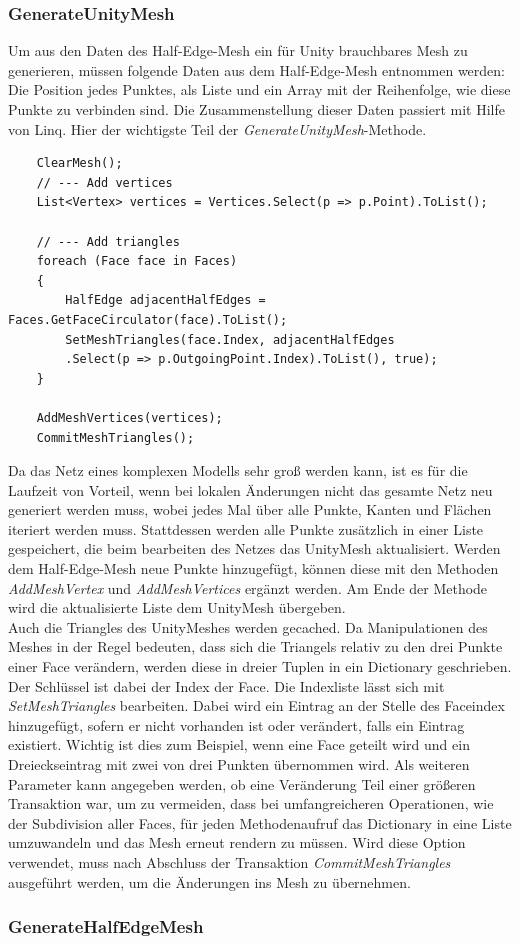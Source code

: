 \subsubsection{GenerateUnityMesh}
Um aus den Daten des Half-Edge-Mesh ein f\"ur Unity brauchbares Mesh zu generieren, m\"ussen folgende Daten aus dem Half-Edge-Mesh entnommen werden: Die Position jedes Punktes, als Liste und ein Array mit der Reihenfolge, wie diese Punkte zu verbinden sind. Die Zusammenstellung dieser Daten passiert mit Hilfe von Linq. Hier der wichtigste Teil der \textit{GenerateUnityMesh}-Methode.
\begin{lstlisting}
	ClearMesh();
	// --- Add vertices
	List<Vertex> vertices = Vertices.Select(p => p.Point).ToList();

	// --- Add triangles
	foreach (Face face in Faces)
	{
		HalfEdge adjacentHalfEdges = Faces.GetFaceCirculator(face).ToList();
		SetMeshTriangles(face.Index, adjacentHalfEdges
		.Select(p => p.OutgoingPoint.Index).ToList(), true);
	}

	AddMeshVertices(vertices);
	CommitMeshTriangles();
\end{lstlisting}
Da das Netz eines komplexen Modells sehr gro{\ss} werden kann, ist es f\"ur die Laufzeit von Vorteil, wenn bei lokalen \"Anderungen nicht das gesamte Netz neu generiert werden muss, wobei jedes Mal \"uber alle Punkte, Kanten und Fl\"achen iteriert werden muss. Stattdessen werden alle Punkte zus\"atzlich in einer Liste gespeichert, die beim bearbeiten des Netzes das UnityMesh aktualisiert. Werden dem Half-Edge-Mesh neue Punkte hinzugef\"ugt, k\"onnen diese mit den Methoden \textit{AddMeshVertex} und \textit{AddMeshVertices} erg\"anzt werden. Am Ende der Methode wird die aktualisierte Liste dem UnityMesh \"ubergeben. 
\\
Auch die Triangles des UnityMeshes werden gecached. Da Manipulationen des Meshes in der Regel bedeuten, dass sich die Triangels relativ zu den drei Punkte einer Face ver\"andern, werden diese in dreier Tuplen in ein Dictionary geschrieben. Der Schl\"ussel ist dabei der Index der Face. Die Indexliste l\"asst sich mit \textit{SetMeshTriangles} bearbeiten. Dabei wird ein Eintrag an der Stelle des Faceindex hinzugef\"ugt, sofern er nicht vorhanden ist oder ver\"andert, falls ein Eintrag existiert. Wichtig ist dies zum Beispiel, wenn eine Face geteilt wird und ein Dreieckseintrag mit zwei von drei Punkten \"ubernommen wird. Als weiteren Parameter kann angegeben werden, ob eine Ver\"anderung Teil einer gr\"o{\ss}eren Transaktion war, um zu vermeiden, dass bei umfangreicheren Operationen, wie der Subdivision aller Faces, f\"ur jeden Methodenaufruf das Dictionary in eine Liste umzuwandeln und das Mesh erneut rendern zu m\"ussen. Wird diese Option verwendet, muss nach Abschluss der Transaktion \textit{CommitMeshTriangles} ausgef\"uhrt werden, um die \"Anderungen ins Mesh zu \"ubernehmen.

\subsubsection{GenerateHalfEdgeMesh}
